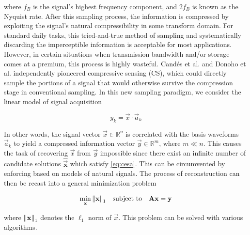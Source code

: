 \documentclass[10pt,a4paper,twoside]{article}
\begin{document}
\noindent where $f_B$ is the signal's highest frequency component, and $2f_B$ is known as the Nyquist rate. After this sampling process, the information is compressed by exploiting the signal's natural compressibility in some transform domain. For standard daily tasks, this tried-and-true method of sampling and systematically discarding the imperceptible information is acceptable for most applications. However, in certain situations when transmission bandwidth and/or storage comes at a premium, this process is highly wasteful. Cand\'{e}s et al. \cite{Candes2006} and Donoho et al. \cite{Donoho2006} independently pioneered compressive sensing (CS), which could directly sample the portions of a signal that would otherwise survive the compression stage in conventional sampling. In this new sampling paradigm, we consider the linear model of signal acquisition

\begin{equation}\label{eq:cesa}
	y_k = \vec{x} \cdot \vec{a}_k
\end{equation}

In other words, the signal vector $\vec{x} \in \mathbb{R}^n$ is correlated with the basis waveforms $\vec{a}_k$ to yield a compressed information vector $\vec{y} \in \mathbb{R}^m$, where $m \ll n$. This causes the task of recovering $\vec{x}$ from $\vec{y}$ impossible since there exist an infinite number of candidate solutions $\bm\hat{\vec{x}}$ which satisfy \eqref{eq:cesa}. This can be circumvented by enforcing  based on models of natural signals.  The process of reconstruction can then be recast into a general minimization problem

\begin{equation}\label{eq:minl1}
	\min_{\text{\bfseries x}} \norm{\text{\bfseries x}}_1 \quad \textrm{subject to} \quad \text{\bfseries A}\text{\bfseries x} = \text{\bfseries y}
\end{equation}

\noindent where $\norm{\text{\bfseries x}}_1$ denotes the $\ell_1$ norm of $\vec{x}$. This problem can be solved with various algorithms.
\end{document}
